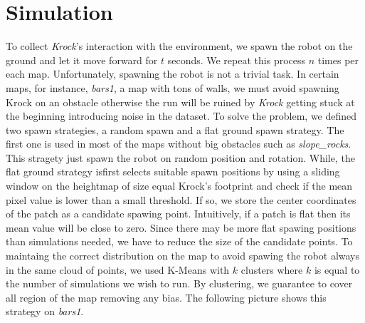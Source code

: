 \documentclass[../document.tex]{subfiles}
\begin{document}
\section{Simulation}
To collect \emph{Krock}'s interaction with the environment, we spawn the robot on the ground and let it move forward for $t$ seconds. We repeat this process $n$ times per each map.
    Unfortunately, spawning the robot is not a trivial task. In certain maps, for instance, \emph{bars1}, a map with tons of walls, we must avoid spawning Krock on an obstacle otherwise the run will be ruined by \emph{Krock} getting stuck at the beginning introducing noise in the dataset. To solve the problem, we defined two spawn strategies, a random spawn and a flat ground spawn strategy. The first one is used in most of the maps without big obstacles such as \emph{slope\_rocks}. This stragety just spawn the robot on random position and rotation. 
    While, the flat ground strategy isfirst selects suitable spawn positions by using a sliding window on the heightmap of size equal Krock's footprint and check if the mean pixel value is lower than a small threshold. If so, we store the center coordinates of the patch as a candidate spawing point. Intuitively, if a patch is flat then its mean value will be close to zero.
Since there may be more flat spawing positions than simulations needed, we have to reduce the size of the candidate points. To maintaing the correct distribution on the map to avoid spawing the robot always in the same cloud of points, we used K-Means with $k$ clusters where $k$ is equal to the number of simulations we wish to run. By clustering, we guarantee to cover all region of the map removing any bias. The following picture shows this strategy on \emph{bars1}. 
\end{document}
